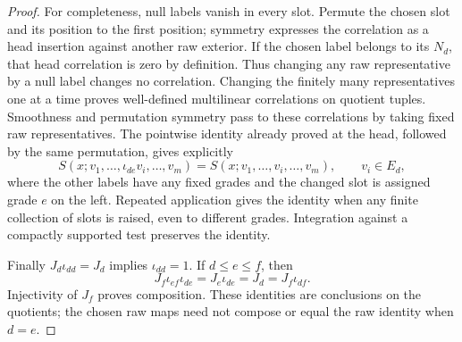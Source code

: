 \begin{proof}
For completeness, null labels vanish in every slot. Permute the chosen
slot and its position to the first position; symmetry expresses the
correlation as a head insertion against another raw exterior. If the
chosen label belongs to its $N_d$, that head correlation is zero by
definition. Thus changing any raw representative by a null label changes
no correlation. Changing the finitely many representatives one at a time
proves well-defined multilinear correlations on quotient tuples. Smoothness
and permutation symmetry pass to these correlations by taking fixed raw
representatives. The pointwise identity already proved at the head,
followed by the same permutation, gives explicitly
\begin{equation}\label{eq:phase-inclusion-slot}
 S(x;v_1,\ldots,\iota_{de}v_i,\ldots,v_m)
       =S(x;v_1,\ldots,v_i,\ldots,v_m),
 \qquad v_i\in E_d,
\end{equation}
where the other labels have any fixed grades and the changed slot is
assigned grade $e$ on the left. Repeated application gives the identity
when any finite collection of slots is raised, even to different grades.
Integration against a compactly supported test preserves the identity.

Finally $J_d\iota_{dd}=J_d$ implies $\iota_{dd}=1$. If $d\le e\le f$,
then
\[
 J_f\iota_{ef}\iota_{de}=J_e\iota_{de}=J_d
                         =J_f\iota_{df}.
\]
Injectivity of $J_f$ proves composition. These identities are conclusions
on the quotients; the chosen raw maps need not compose or equal the raw
identity when $d=e$.
\end{proof}

